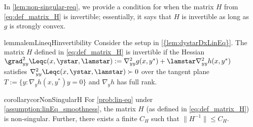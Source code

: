 In \cref{lem:non-singular-req}, we provide a condition
for when the matrix $H$ from  \cref{eq:def_matrix_H} is invertible; essentially, it says that
$H$ is invertible as long as $g$ is strongly convex. 
\begin{restatable}{lemma}{lemLineqHinvertibility}\label{lem:non-singular-req} 
Consider the setup in \cref{{lem:dystarDxLinEq}}. The matrix $H$ defined in \cref{eq:def_matrix_H}  is invertible if
the Hessian $\grad_{yy}^{2}\Leqc(x,\ystar,\lamstar):=\nabla^2_{yy} g(x, y^*) +\lamstar \nabla^2_{yy} h(x, y^*)$
satisfies $\nabla_{yy}^{2}\Leqc(x,\ystar,\lamstar)\succ0$ over
the tangent plane $T:=\{y:\nabla_y h(x,y^{*})y=0\}$ and $\nabla_y h$ has full
rank.
\end{restatable}

%
\begin{restatable}{corollary}{corNonSingularH}\label{cor:nonsingularH}
For \cref{prob:lin-eq} under \cref{assumption:linEq_smoothness}, 
 the matrix $H$  (as defined in \cref{eq:def_matrix_H}) is non-singular. Further, there exists a finite $C_H$ such that $\|H^{-1}\|\leq C_H$. 
\end{restatable}

